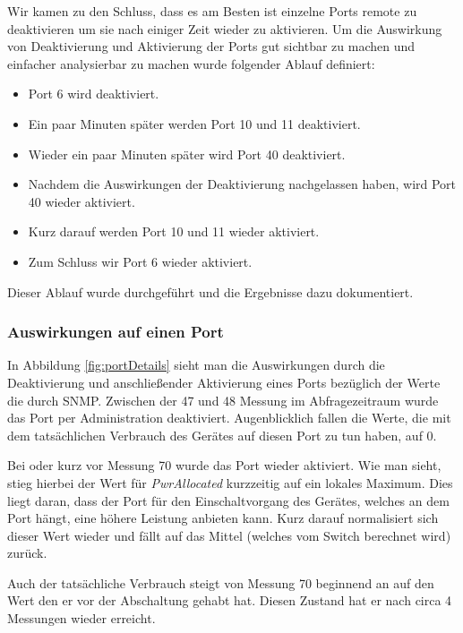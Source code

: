 Wir kamen zu den Schluss, dass es am Besten ist einzelne Ports remote zu deaktivieren um sie nach einiger Zeit wieder zu aktivieren. Um die Auswirkung von Deaktivierung und Aktivierung der Ports gut sichtbar zu machen und einfacher analysierbar zu machen wurde folgender Ablauf definiert:

\begin{itemize}
 \item Port 6 wird deaktiviert.
 \item Ein paar Minuten später werden Port 10 und 11 deaktiviert.
 \item Wieder ein paar Minuten später wird Port 40 deaktiviert.
 \item Nachdem die Auswirkungen der Deaktivierung nachgelassen haben, wird Port 40 wieder aktiviert.
 \item Kurz darauf werden Port 10 und 11 wieder aktiviert.
 \item Zum Schluss wir Port 6 wieder aktiviert.
\end{itemize}

Dieser Ablauf wurde durchgeführt und die Ergebnisse dazu dokumentiert.

\subsubsection{Auswirkungen auf einen Port}
In Abbildung \ref{fig:portDetails} sieht man die Auswirkungen durch die Deaktivierung und anschließender Aktivierung eines Ports bezüglich der Werte die durch SNMP. Zwischen der 47 und 48 Messung im Abfragezeitraum wurde das Port per Administration deaktiviert. Augenblicklich fallen die Werte, die mit dem tatsächlichen Verbrauch des Gerätes auf diesen Port zu tun haben, auf 0. 

Bei oder kurz vor Messung 70 wurde das Port wieder aktiviert. Wie man sieht, stieg hierbei der Wert für \textit{PwrAllocated} kurzzeitig auf ein lokales Maximum. Dies liegt daran, dass der Port für den Einschaltvorgang des Gerätes, welches an dem Port hängt, eine höhere Leistung anbieten kann. Kurz darauf normalisiert sich dieser Wert wieder und fällt auf das Mittel (welches vom Switch berechnet wird) zurück.

Auch der tatsächliche Verbrauch steigt von Messung 70 beginnend an auf den Wert den er vor der Abschaltung gehabt hat. Diesen Zustand hat er nach circa 4 Messungen wieder erreicht.

